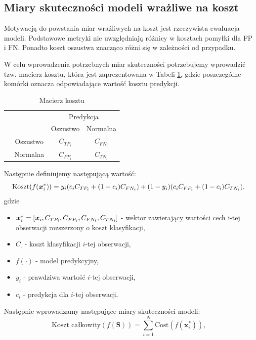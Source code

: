 \documentclass[inzynierska]{pwr_wmat_praca_dyplomowa}
\theoremstyle{plain}
\numberwithin{theorem}{chapter}
\theoremstyle{definition}
\numberwithin{theorem}{chapter}
\begin{document}
\subsection{Miary skuteczności modeli wrażliwe na koszt}
Motywacją do powstania miar wrażliwych na koszt jest rzeczywista ewaluacja modeli. Podstawowe metryki nie uwzględniają różnicy w kosztach pomyłki dla FP i FN. Ponadto koszt oszustwa znacząco różni się w zależności od przypadku.

W celu wprowadzenia potrzebnych miar skuteczności potrzebujemy wprowadzić tzw. macierz kosztu, która jest zaprezentowana w Tabeli \ref{macierz-kosztu}, gdzie poszczególne komórki oznacza odpowiadające wartość kosztu predykcji. 
\begin{table}[h]
	\begin{center}
		\makegapedcells
		\begin{tabular}{cc|cc}
			\multicolumn{2}{c}{}     &   \multicolumn{2}{c}{Predykcja} \\
			&            &   Oszustwo &   Normalna     \\ 
			\cline{2-4}
			\multirow{2}{*}{\rotatebox[origin=c]{90}{Prawda}} & Oszustwo   & $C_{TP_{i}}$         & $C_{FN_{i}}$              \\
			& Normalna   & $C_{FP_{i}}$         & $C_{TN_{i}}$              \\ 
			\cline{2-4}
		\end{tabular}
	\end{center}
	\caption{Macierz kosztu}
	\label{macierz-kosztu}
\end{table}
Następnie definiujemy następującą wartość:
$$ \text{Koszt}(f(\boldsymbol{x}_{i}^{*})) = y_i (c_i C_{TP_i} + (1-c_i)C_{FN_i}) + (1-y_i)(c_i C_{FP_i} + (1-c_i)C_{TN_i}) \text{,}$$
gdzie 
\begin{itemize}
	\item $\boldsymbol{x}_{i}^{*} = [\boldsymbol{x}_i, C_{TP_{i}}, C_{FP_{i}}, C_{FN_{i}}, C_{TN_{i}}]$ - wektor zawierający wartości cech i-tej obserwacji rozszerzony o koszt klasyfikacji,
	\item $C_{\cdot}$ - koszt klasyfikacji $i$-tej obserwacji,
	\item $f(\cdot)$ - model predykcyjny,
	\item $y_i$ - prawdziwa wartość $i$-tej obserwacji,
	\item $c_i$ - predykcja dla $i$-tej obserwacji.
\end{itemize}{}
Następnie wprowadzamy następujące miary skuteczności modeli:
\begin{equation}
\label{koszt-calkowity}
\text{Koszt całkowity}(f(\boldsymbol{S})) = \sum_{i=1}^{N}\text{Cost}(f(\boldsymbol{x}_{i}^{*})) \text{,}
\end{equation} 
\end{document}
